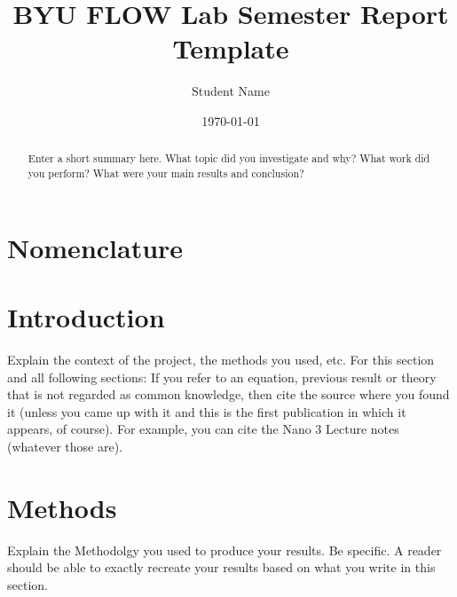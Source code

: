 \documentclass[]{article}%
\title{BYU FLOW Lab Semester Report Template}
\author{Student Name}
\date{\today} %
\begin{document}
\maketitle

\begin{abstract}
Enter a short summary here. What topic did you investigate and why? What work did you perform? What were your main results and conclusion?
\end{abstract}

\section*{Nomenclature}
\smallskip
\begin{multicols}{2}
\printnomenclature
\end{multicols}


\section{Introduction}
\label{sec:introduction}

Explain the context of the project, the methods you used, etc.  For this section and all following sections: If you refer to an equation, previous result or theory that is not regarded as common knowledge, then cite the source where you found it (unless you came up with it and this is the first publication in which it appears, of course). For example, you can cite the Nano 3 Lecture notes \cite{nano3} (whatever those are).


\section{Methods}
\label{sec:methods}

Explain the Methodolgy you used to produce your results.  Be specific. A reader should be able to exactly recreate your results based on what you write in this section.
\end{document}

